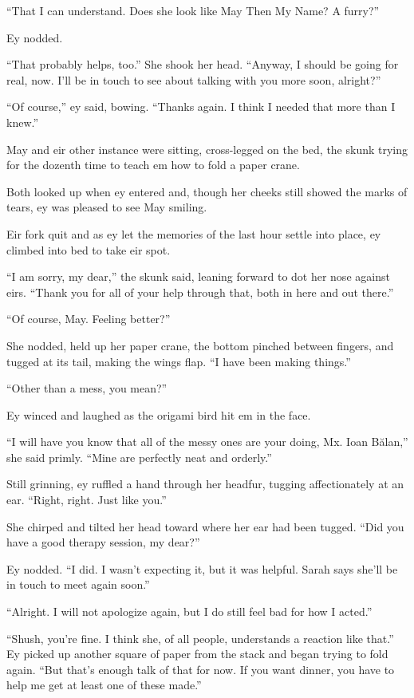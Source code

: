 ``That I can understand. Does she look like May Then My Name? A furry?''

Ey nodded.

``That probably helps, too.'' She shook her head. ``Anyway, I should be going for real, now. I'll be in touch to see about talking with you more soon, alright?''

``Of course,'' ey said, bowing. ``Thanks again. I think I needed that more than I knew.''

May and eir other instance were sitting, cross-legged on the bed, the skunk trying for the dozenth time to teach em how to fold a paper crane.

Both looked up when ey entered and, though her cheeks still showed the marks of tears, ey was pleased to see May smiling.

Eir fork quit and as ey let the memories of the last hour settle into place, ey climbed into bed to take eir spot.

``I am sorry, my dear,'' the skunk said, leaning forward to dot her nose against eirs. ``Thank you for all of your help through that, both in here and out there.''

``Of course, May. Feeling better?''

She nodded, held up her paper crane, the bottom pinched between fingers, and tugged at its tail, making the wings flap. ``I have been making things.''

``Other than a mess, you mean?''

Ey winced and laughed as the origami bird hit em in the face.

``I will have you know that all of the messy ones are your doing, Mx. Ioan Bălan,'' she said primly. ``Mine are perfectly neat and orderly.''

Still grinning, ey ruffled a hand through her headfur, tugging affectionately at an ear. ``Right, right. Just like you.''

She chirped and tilted her head toward where her ear had been tugged. ``Did you have a good therapy session, my dear?''

Ey nodded. ``I did. I wasn't expecting it, but it was helpful. Sarah says she'll be in touch to meet again soon.''

``Alright. I will not apologize again, but I do still feel bad for how I acted.''

``Shush, you're fine. I think she, of all people, understands a reaction like that.'' Ey picked up another square of paper from the stack and began trying to fold again. ``But that's enough talk of that for now. If you want dinner, you have to help me get at least one of these made.''
